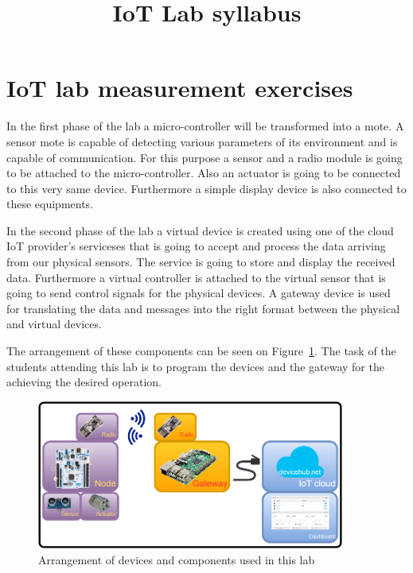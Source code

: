 \documentclass[a4paper]{article}
\title{IoT Lab syllabus}
\author{}
\date{}
\begin{document}
\maketitle

\tableofcontents

\section{IoT lab measurement exercises}

In the first phase of the lab a micro-controller will be transformed into a mote. A sensor mote is capable of detecting
various parameters of its environment and is capable of communication. For this purpose a sensor and a radio module is
going to be attached to the micro-controller. Also an actuator is going to be connected to this very same device.
Furthermore a simple display device is also connected to these equipments.

In the second phase of the lab a virtual device is created using one of the cloud IoT provider's serviceses that is
going
to accept and process the data arriving from our physical sensors. The service is going to store and display the
received data.
Furthermore a virtual controller is attached to the virtual sensor that is going to send control signals for the
physical devices. A gateway device is used for translating the data and messages into the right format between the
physical and
virtual devices.

The arrangement of these components can be seen on Figure~\ref{fig:meas-arrangement}. The task of the students
attending this lab is to program the devices and the gateway for the achieving the desired operation.

\begin{figure}[H]
    \centering
    \includegraphics[width=0.9\textwidth]{figures/devices-arrangement.png}
    \caption{Arrangement of devices and components used in this lab}
    \label{fig:meas-arrangement}
\end{figure}
\end{document}
